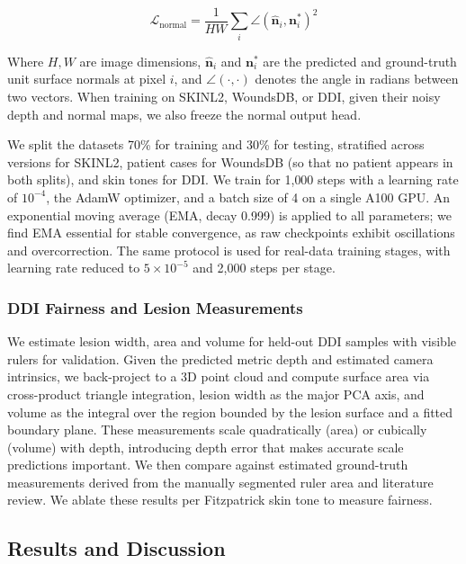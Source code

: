\documentclass[11pt]{ucthesis}
\begin{document}
\begin{equation}
\mathcal{L}_{\text{normal}} = \frac{1}{HW} \sum_{i} \angle(\hat{\mathbf{n}}_i, \mathbf{n}_i^*)^2
\end{equation}

\noindent Where $H, W$ are image dimensions, $\hat{\mathbf{n}}_i$ and $\mathbf{n}_i^*$ are the predicted and ground-truth unit surface normals at pixel $i$, and $\angle(\cdot,\cdot)$ denotes the angle in radians between two vectors. When training on SKINL2, WoundsDB, or DDI, given their noisy depth and normal maps, we also freeze the normal output head.

We split the datasets 70\% for training and 30\% for testing, stratified across versions for SKINL2, patient cases for WoundsDB (so that no patient appears in both splits), and skin tones for DDI. We train for 1{,}000 steps with a learning rate of $10^{-4}$, the AdamW optimizer, and a batch size of 4 on a single A100 GPU. An exponential moving average (EMA, decay 0.999) is applied to all parameters; we find EMA essential for stable convergence, as raw checkpoints exhibit oscillations and overcorrection. The same protocol is used for real-data training stages, with learning rate reduced to $5 \times 10^{-5}$ and 2{,}000 steps per stage.

\subsubsection{DDI Fairness and Lesion Measurements}\label{sec:downstream}
We estimate lesion width, area and volume for held-out DDI samples with visible rulers for validation. Given the predicted metric depth and estimated camera intrinsics, we back-project to a 3D point cloud and compute surface area via cross-product triangle integration, lesion width as the major PCA axis, and volume as the integral over the region bounded by the lesion surface and a fitted boundary plane. These measurements scale quadratically (area) or cubically (volume) with depth, introducing depth error that makes accurate scale predictions important. We then compare against estimated ground-truth measurements derived from the manually segmented ruler area and literature review. We ablate these results per Fitzpatrick skin tone to measure fairness.

\subsection{Results and Discussion}\label{sec:dd_results}
\end{document}
